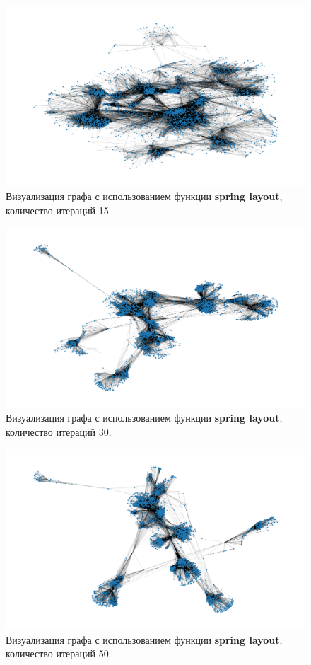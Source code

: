 \begin{figure}[H]
	\centering
	\includegraphics[width=\textwidth]{inc/2.png}
	\caption{ Визуализация графа с использованием функции \textbf{spring layout}, количество итераций 15.}
	\label{img:2}
\end{figure}

\begin{figure}[H]
	\centering
	\includegraphics[width=\textwidth]{inc/3.png}
	\caption{ Визуализация графа с использованием функции \textbf{spring layout}, количество итераций 30.}
	\label{img:3}
\end{figure}

\begin{figure}[H]
	\centering
	\includegraphics[width=\textwidth]{inc/4.png}
	\caption{ Визуализация графа с использованием функции \textbf{spring layout}, количество итераций 50.}
	\label{img:4}
\end{figure}

